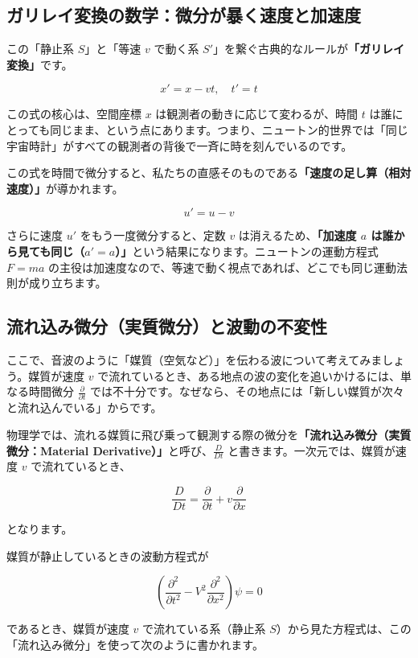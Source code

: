 \subsection{ガリレイ変換の数学：微分が暴く速度と加速度}

この「静止系 \(S\)」と「等速 \(v\) で動く系 \(S'\)」を繋ぐ古典的なルールが\textbf{「ガリレイ変換」}です。

\[
x' = x - vt,\quad t' = t
\]

この式の核心は、空間座標 \(x\) は観測者の動きに応じて変わるが、時間 \(t\) は誰にとっても同じまま、という点にあります。つまり、ニュートン的世界では「同じ宇宙時計」がすべての観測者の背後で一斉に時を刻んでいるのです。

この式を時間で微分すると、私たちの直感そのものである\textbf{「速度の足し算（相対速度）」}が導かれます。

\[
u' = u - v
\]

さらに速度 \(u'\) をもう一度微分すると、定数 \(v\) は消えるため、\textbf{「加速度 \(a\) は誰から見ても同じ（\(a' = a\)）」}という結果になります。ニュートンの運動方程式 \(F = ma\) の主役は加速度なので、等速で動く視点であれば、どこでも同じ運動法則が成り立ちます。

\subsection{流れ込み微分（実質微分）と波動の不変性}

ここで、音波のように「媒質（空気など）」を伝わる波について考えてみましょう。媒質が速度 \(v\) で流れているとき、ある地点の波の変化を追いかけるには、単なる時間微分 \(\frac{\partial}{\partial t}\) では不十分です。なぜなら、その地点には「新しい媒質が次々と流れ込んでいる」からです。

物理学では、流れる媒質に飛び乗って観測する際の微分を\textbf{「流れ込み微分（実質微分：Material Derivative）」}と呼び、\(\frac{D}{Dt}\) と書きます。一次元では、媒質が速度 \(v\) で流れているとき、

\[
\frac{D}{Dt}
=
\frac{\partial}{\partial t}
+
v\frac{\partial}{\partial x}
\]

となります。

媒質が静止しているときの波動方程式が

\[
\left(
\frac{\partial^2}{\partial t^2}
-
V^2\frac{\partial^2}{\partial x^2}
\right)\psi=0
\]

であるとき、媒質が速度 \(v\) で流れている系（静止系 \(S\)）から見た方程式は、この「流れ込み微分」を使って次のように書かれます。

